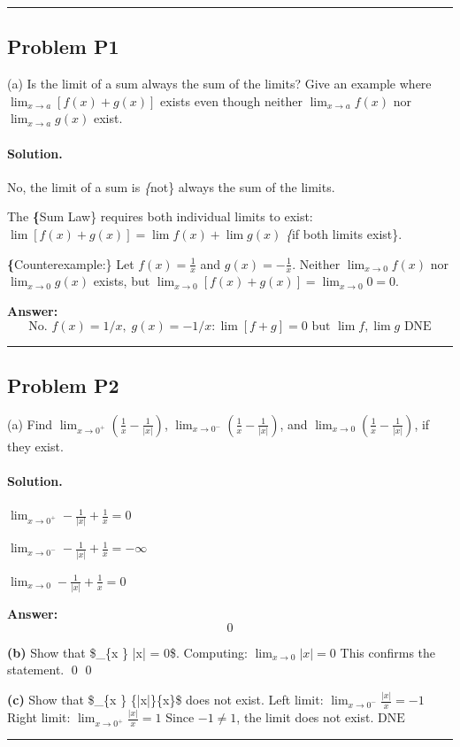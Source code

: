 \documentclass[12pt, a4paper]{article}
\newcommand{\problem}[1]{\subsection*{Problem #1}}
\newcommand{\solution}{\paragraph{Solution.}}
\begin{document}
\vspace{1em}
\hrule
\vspace{1em}

\problem{P1}

(a) Is the limit of a sum always the sum of the limits? Give an example where $\lim_{x \to a}[f(x) + g(x)]$ exists even though neither $\lim_{x \to a} f(x)$ nor $\lim_{x \to a} g(x)$ exist.

\solution

No, the limit of a sum is \emph\{not\} always the sum of the limits.

The \textbf\{Sum Law\} requires both individual limits to exist: $\lim[f(x)+g(x)] = \lim f(x) + \lim g(x)$ \emph\{if both limits exist\}.

\textbf\{Counterexample:\} Let $f(x) = \frac{1}{x}$ and $g(x) = -\frac{1}{x}$. Neither $\lim_{x \to 0} f(x)$ nor $\lim_{x \to 0} g(x)$ exists, but $\lim_{x \to 0}[f(x)+g(x)] = \lim_{x \to 0} 0 = 0$.

\textbf{Answer:}
\[\text{No. } f(x)=1/x,\; g(x)=-1/x: \lim[f+g]=0 \text{ but } \lim f, \lim g \text{ DNE}\]

\vspace{1em}
\hrule
\vspace{1em}

\problem{P2}

(a) Find $\lim_{x \to 0^+}(\frac{1}{x} - \frac{1}{|x|})$, $\lim_{x \to 0^-}(\frac{1}{x} - \frac{1}{|x|})$, and $\lim_{x \to 0}(\frac{1}{x} - \frac{1}{|x|})$, if they exist.

\solution

$\lim_{x \to 0^+} - \frac{1}{\left|{x}\right|} + \frac{1}{x} = 0$

$\lim_{x \to 0^-} - \frac{1}{\left|{x}\right|} + \frac{1}{x} = -\infty$

$\lim_{x \to 0} - \frac{1}{\left|{x}\right|} + \frac{1}{x} = 0$

\textbf{Answer:}
\[0\]

\textbf{(b)}
Show that \$\lim\_\{x \} |x| = 0\$.
Computing: $\lim_{x \to 0} \left|{x}\right| = 0$
This confirms the statement. \qed
$\boxed{0}$

\textbf{(c)}
Show that \$\lim\_\{x \} \frac\{|x|\}\{x\}\$ does not exist.
Left limit: $\lim_{x \to 0^-} \frac{\left|{x}\right|}{x} = -1$
Right limit: $\lim_{x \to 0^+} \frac{\left|{x}\right|}{x} = 1$
Since $-1 \neq 1$, the limit does not exist.
$\boxed{\text{DNE}}$

\vspace{1em}
\hrule
\vspace{1em}
\end{document}
